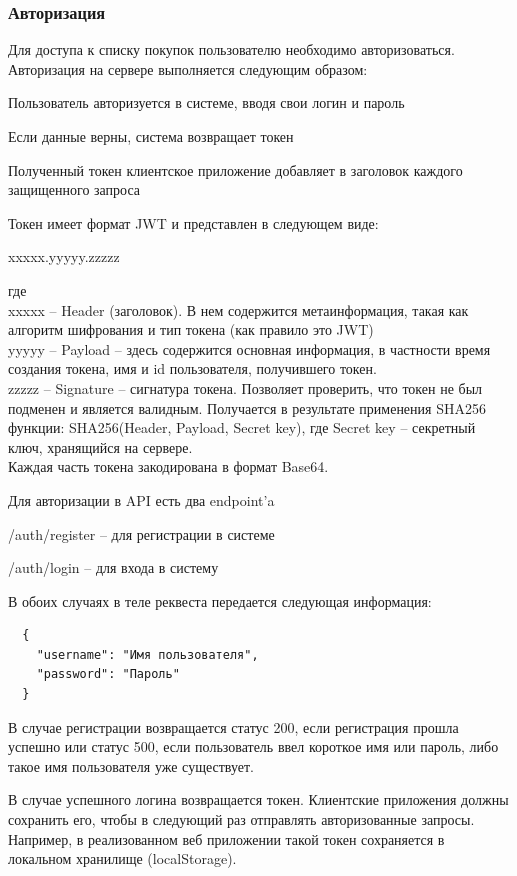 \subsubsection{Авторизация}
Для доступа к списку покупок пользователю необходимо авторизоваться.
Авторизация на сервере выполняется следующим образом:
\begin{my_enumerate}
  \item Пользователь авторизуется в системе, вводя свои логин и пароль
  \item Если данные верны, система возвращает токен
  \item Полученный токен клиентское приложение добавляет в заголовок
    каждого защищенного запроса
\end{my_enumerate}

Токен имеет формат JWT и представлен в следующем виде:
\begin{center}
  xxxxx.yyyyy.zzzzz
\end{center}
где\\
xxxxx -- Header (заголовок). В нем содержится метаинформация, такая как алгоритм шифрования и тип токена (как правило это JWT)\\
yyyyy -- Payload -- здесь содержится основная информация, в частности время создания токена, имя и id пользователя, получившего токен.\\
zzzzz -- Signature -- сигнатура токена. Позволяет проверить, что токен не был
подменен и является валидным. Получается в результате применения SHA256 функции:
SHA256(Header, Payload, Secret key), где Secret key -- секретный ключ, хранящийся на сервере. \\
Каждая часть токена закодирована в формат Base64.

Для авторизации в API есть два endpoint'a
\begin{my_enumerate}
  \item /auth/register -- для регистрации в системе
  \item /auth/login -- для входа в систему
\end{my_enumerate}

В обоих случаях в теле реквеста передается следующая информация: 
\begin{verbatim}
  {
    "username": "Имя пользователя",
    "password": "Пароль"
  }
\end{verbatim}

В случае регистрации возвращается статус 200, если регистрация прошла успешно
или статус 500, если пользователь ввел короткое имя или пароль, либо такое
имя пользователя уже существует.

В случае успешного логина возвращается токен. Клиентские приложения должны
сохранить его, чтобы в следующий раз отправлять авторизованные запросы.
Например, в реализованном веб приложении такой токен сохраняется в локальном хранилище
(localStorage).

